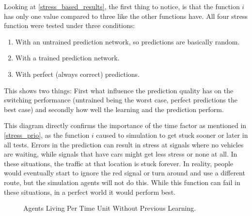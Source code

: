 Looking at \autoref{stress_based_results}, the first thing to notice, is that the function $i$ has only one value compared to three like the other functions have. All four stress function were tested under three conditions:

\begin{enumerate}
	\item With an untrained prediction network, so predictions are basically random.
	\item With a trained prediction network.
	\item With perfect (always correct) predictions.
\end{enumerate}

This shows two things: First what influence the prediction quality has on the switching performance (untrained being the worst case, perfect predictions the best case) and secondly how well the learning and the prediction perform.

This diagram directly confirms the importance of the time factor as mentioned in \autoref{stress_prio}, as the function $i$ caused to simulation to get stuck sooner or later in all tests. Errors in the prediction can result in stress at signals where no vehicles are waiting, while signals that have cars might get less stress or none at all. In these situations, the traffic at that location is stuck forever. In reality, people would eventually start to ignore the red signal or turn around and use a different route, but the simulation agents will not do this. While this function can fail in these situations, in a perfect world it would perform best.

\begin{figure}[ht!]
	\centering
	\caption{Agents Living Per Time Unit Without Previous Learning.}
	\label{agent_statistic_dumb}
\end{figure}


